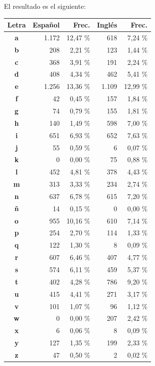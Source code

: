 \documentclass[12pt,a4paper,twoside]{book}
\begin{document}
El resultado es el siguiente:

\begin{center}
\begin{longtable}{|c|r|r|r|r|}
\hline
\textbf{Letra} & \textbf{Español} & \textbf{Frec.} & \textbf{Inglés} & \textbf{Frec.} \\ \hline
\textbf{a} & 1.172 & 12,47 \% & 618 & 7,24 \% \\ \hline
\textbf{b} & 208 & 2,21 \% & 123 & 1,44 \% \\ \hline
\textbf{c} & 368 & 3,91 \% & 191 & 2,24 \% \\ \hline
\textbf{d} & 408 & 4,34 \% & 462 & 5,41 \% \\ \hline
\textbf{e} & 1.256 & 13,36 \% & 1.109 & 12,99 \% \\ \hline
\textbf{f} & 42 & 0,45 \% & 157 & 1,84 \% \\ \hline
\textbf{g} & 74 & 0,79 \% & 155 & 1,81 \% \\ \hline
\textbf{h} & 140 & 1,49 \% & 598 & 7,00 \% \\ \hline
\textbf{i} & 651 & 6,93 \% & 652 & 7,63 \% \\ \hline
\textbf{j} & 55 & 0,59 \% & 6 & 0,07 \% \\ \hline
\textbf{k} & 0 & 0,00 \% & 75 & 0,88 \% \\ \hline
\textbf{l} & 452 & 4,81 \% & 378 & 4,43 \% \\ \hline
\textbf{m} & 313 & 3,33 \% & 234 & 2,74 \% \\ \hline
\textbf{n} & 637 & 6,78 \% & 615 & 7,20 \% \\ \hline
\textbf{ñ} & 14 & 0,15 \% & 0 & 0,00 \% \\ \hline
\textbf{o} & 955 & 10,16 \% & 610 & 7,14 \% \\ \hline
\textbf{p} & 254 & 2,70 \% & 114 & 1,33 \% \\ \hline
\textbf{q} & 122 & 1,30 \% & 8 & 0,09 \% \\ \hline
\textbf{r} & 607 & 6,46 \% & 407 & 4,77 \% \\ \hline
\textbf{s} & 574 & 6,11 \% & 459 & 5,37 \% \\ \hline
\textbf{t} & 402 & 4,28 \% & 786 & 9,20 \% \\ \hline
\textbf{u} & 415 & 4,41 \% & 271 & 3,17 \% \\ \hline
\textbf{v} & 101 & 1,07 \% & 96 & 1,12 \% \\ \hline
\textbf{w} & 0 & 0,00 \% & 207 & 2,42 \% \\ \hline
\textbf{x} & 6 & 0,06 \% & 8 & 0,09 \% \\ \hline
\textbf{y} & 127 & 1,35 \% & 199 & 2,33 \% \\ \hline
\textbf{z} & 47 & 0,50 \% & 2 & 0,02 \% \\ \hline
\end{longtable}
\end{center}
\end{document}
